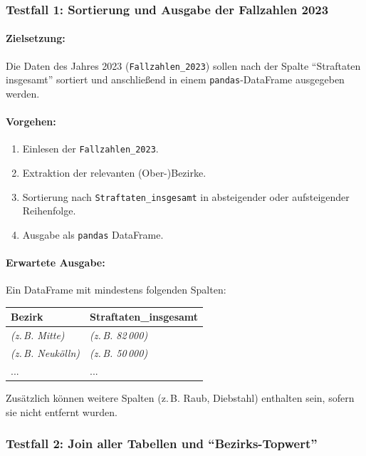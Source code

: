 \documentclass[11pt,a4paper]{article}
\begin{document}
\subsubsection{Testfall 1: Sortierung und Ausgabe der Fallzahlen 2023}
\label{subsec:tf1}
\paragraph{Zielsetzung:}
Die Daten des Jahres 2023 (\texttt{Fallzahlen\_2023}) sollen nach der Spalte \enquote{Straftaten insgesamt} sortiert und anschließend in einem \texttt{pandas}-DataFrame ausgegeben werden.

\paragraph{Vorgehen:}
\begin{enumerate}
    \item Einlesen der \texttt{Fallzahlen\_2023}.
    \item Extraktion der relevanten (Ober-)Bezirke.
    \item Sortierung nach \texttt{Straftaten\_insgesamt} in absteigender oder aufsteigender Reihenfolge.
    \item Ausgabe als \texttt{pandas} DataFrame.
\end{enumerate}

\paragraph{Erwartete Ausgabe:}
Ein DataFrame mit mindestens folgenden Spalten:
\begin{center}
    \begin{tabular}{|l|l|}
        \hline
        \textbf{Bezirk} & \textbf{Straftaten\_insgesamt} \\
        \hline
        \textit{(z.\,B. Mitte)} & \textit{(z.\,B. 82\,000)} \\
        \textit{(z.\,B. Neukölln)} & \textit{(z.\,B. 50\,000)} \\
        ... & ...\\
        \hline
    \end{tabular}
\end{center}
Zusätzlich können weitere Spalten (z.\,B. Raub, Diebstahl) enthalten sein, sofern sie nicht entfernt wurden.

\subsubsection{Testfall 2: Join aller Tabellen und \enquote{Bezirks-Topwert}}
\end{document}
